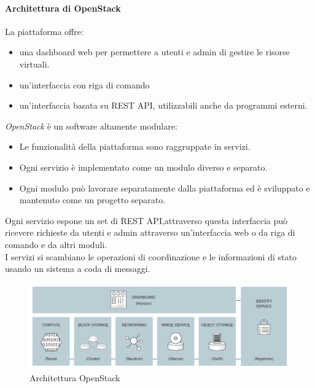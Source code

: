 \documentclass{article}
\begin{document}
\paragraph{Architettura di OpenStack}
La piattaforma offre:
\begin{itemize}
    \item una dashboard web per permettere a utenti e admin di gestire le risorse virtuali.
    \item un'interfaccia con riga di comando
    \item un'interfaccia basata su REST API, utilizzabili anche da programmi esterni.
\end{itemize}
\textit{OpenStack} è un software altamente modulare:
\begin{itemize}
    \item Le funzionalità della piattaforma sono raggruppate in servizi.
    \item Ogni servizio è implementato come un modulo diverso e separato.
    \item Ogni modulo può lavorare separatamente dalla piattaforma ed è sviluppato e mantenuto come un progetto separato.
\end{itemize}
Ogni servizio espone un set di REST API,attraverso questa interfaccia può ricevere richieste da utenti e admin attraverso un'interfaccia web o da riga di comando e da altri moduli. \\
I servizi si scambiano le operazioni di coordinazione e le informazioni di stato usando un sistema a coda di messaggi.
\begin{figure}[H]
    \centering
    \includegraphics[scale=0.25]{img/os_architecture.png}
    \caption{Architettura OpenStack}
\end{figure}\noindent
\end{document}
